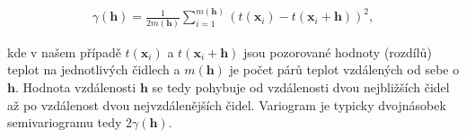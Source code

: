 \begin{gather*}
	\gamma(\mathbf{h}) = \frac{1}{2m(\mathbf{h})}\sum_{i=1}^{m(\mathbf{h})}\left(t(\mathbf{x}_i) - t(\mathbf{x}_i+\mathbf{h})\right)^2,
\end{gather*}

kde v našem případě $t(\mathbf{x}_i)$ a $t(\mathbf{x}_i+\mathbf{h})$ jsou pozorované hodnoty (rozdílů) teplot na jednotlivých čidlech a $m(\mathbf{h})$ je počet párů teplot vzdálených od sebe o $\mathbf{h}$. Hodnota vzdálenosti $\mathbf{h}$ se tedy pohybuje od vzdálenosti dvou nejbližších čidel až po vzdálenost dvou nejvzdálenějších čidel. Variogram je typicky dvojnásobek semivariogramu tedy $2\gamma(\mathbf{h})$\cite{variogram}.
